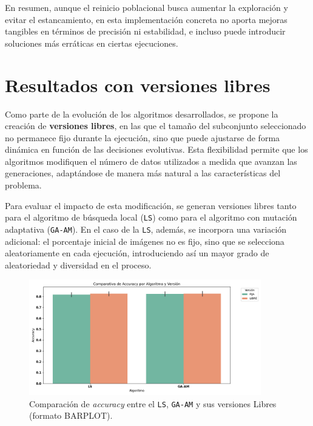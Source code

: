 En resumen, aunque el reinicio poblacional busca aumentar la exploración y evitar el estancamiento,
en esta implementación concreta no aporta mejoras tangibles en términos de precisión ni estabilidad,
e incluso puede introducir soluciones más erráticas en ciertas ejecuciones.

\section{Resultados con versiones libres}\label{sec:resultados-versiones-libres}
Como parte de la evolución de los algoritmos desarrollados, se propone la creación de \textbf{versiones libres},
en las que el tamaño del subconjunto seleccionado no permanece fijo durante la ejecución, sino que puede ajustarse de forma dinámica en función de las decisiones evolutivas.
Esta flexibilidad permite que los algoritmos modifiquen el número de datos utilizados a medida que avanzan las generaciones,
adaptándose de manera más natural a las características del problema.

Para evaluar el impacto de esta modificación, se generan versiones libres tanto para el algoritmo de búsqueda local (\texttt{LS})
como para el algoritmo con mutación adaptativa (\texttt{GA-AM}).
En el caso de la \texttt{LS}, además, se incorpora una variación adicional: el porcentaje inicial de imágenes no es fijo,
sino que se selecciona aleatoriamente en cada ejecución, introduciendo así un mayor grado de aleatoriedad y diversidad en el proceso.


\begin{figure}[htp]
    \centering
    \includegraphics[width=0.9\textwidth]{imagenes/evaluaciones/libres/barplot_por_algoritmo.png}
    \caption{Comparación de \textit{accuracy} entre el \texttt{LS}, \texttt{GA-AM} y sus versiones Libres (formato BARPLOT).}
    \label{fig:barplot_por_algoritmo-libres}
\end{figure}


